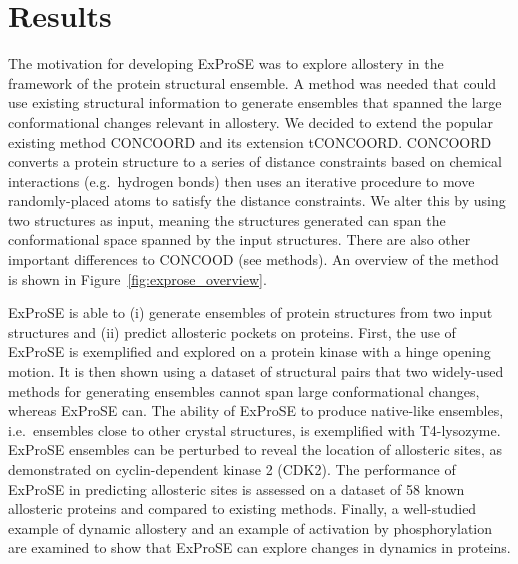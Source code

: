 \section{Results}
\label{sec:exprose_results}

The motivation for developing ExProSE was to explore allostery in the framework of the protein structural ensemble.
A method was needed that could use existing structural information to generate ensembles that spanned the large conformational changes relevant in allostery.
We decided to extend the popular existing method CONCOORD and its extension tCONCOORD.
CONCOORD converts a protein structure to a series of distance constraints based on chemical interactions (e.g.\ hydrogen bonds) then uses an iterative procedure to move randomly-placed atoms to satisfy the distance constraints.
We alter this by using two structures as input, meaning the structures generated can span the conformational space spanned by the input structures.
There are also other important differences to CONCOOD (see methods).
An overview of the method is shown in Figure~\ref{fig:exprose_overview}.

ExProSE is able to (i) generate ensembles of protein structures from two input structures and (ii) predict allosteric pockets on proteins.
First, the use of ExProSE is exemplified and explored on a protein kinase with a hinge opening motion.
It is then shown using a dataset of structural pairs that two widely-used methods for generating ensembles cannot span large conformational changes, whereas ExProSE can.
The ability of ExProSE to produce native-like ensembles, i.e.\ ensembles close to other crystal structures, is exemplified with T4-lysozyme.
ExProSE ensembles can be perturbed to reveal the location of allosteric sites, as demonstrated on cyclin-dependent kinase 2 (CDK2).
The performance of ExProSE in predicting allosteric sites is assessed on a dataset of 58 known allosteric proteins and compared to existing methods.
Finally, a well-studied example of dynamic allostery and an example of activation by phosphorylation are examined to show that ExProSE can explore changes in dynamics in proteins.


